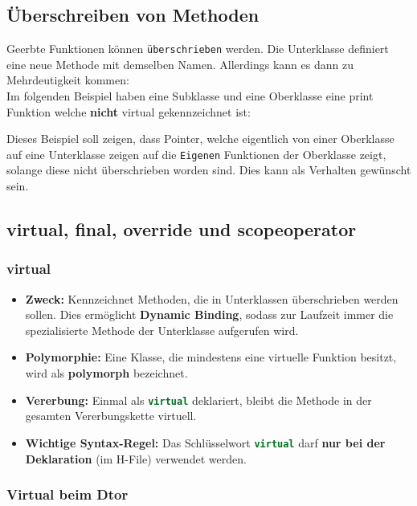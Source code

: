 \subsection{Überschreiben von Methoden}

Geerbte Funktionen können \texttt{überschrieben} werden. 
Die Unterklasse definiert eine neue Methode mit demselben Namen.
Allerdings kann es dann zu Mehrdeutigkeit kommen:\\
Im folgenden Beispiel haben eine Subklasse und eine Oberklasse eine print Funktion welche \textbf{nicht} virtual gekennzeichnet ist:



Dieses Beispiel soll zeigen, dass Pointer, welche eigentlich von einer Oberklasse auf eine Unterklasse zeigen auf die \texttt{Eigenen} Funktionen der Oberklasse zeigt, solange diese nicht überschrieben worden sind.
Dies kann als Verhalten gewünscht sein. 

\subsection{virtual, final, override und scopeoperator}

\subsubsection{virtual}\label{Virtual}
\begin{itemize}
    \item \textbf{Zweck:} Kennzeichnet Methoden, die in Unterklassen überschrieben werden sollen. Dies ermöglicht \textbf{Dynamic Binding}, sodass zur Laufzeit immer die spezialisierte Methode der Unterklasse aufgerufen wird.
    \item \textbf{Polymorphie:} Eine Klasse, die mindestens eine virtuelle Funktion besitzt, wird als \textbf{polymorph} bezeichnet.
    \item \textbf{Vererbung:} Einmal als \lstinline[language=C++]|virtual| deklariert, bleibt die Methode in der gesamten Vererbungskette virtuell. 
    \item \textbf{Wichtige Syntax-Regel:} Das Schlüsselwort \lstinline[language=C++]|virtual| darf 
    \textbf{nur bei der Deklaration} (im H-File) verwendet werden. 
\end{itemize}

\subsubsection{Virtual beim Dtor}


